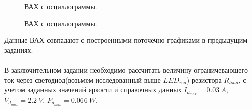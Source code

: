 \documentclass[12pt]{article}
\begin{document}
\begin{figure}[H]
    \centering
        \qquad
        \caption{ВАХ с осциллограммы.}%
    \label{fig:example}
\end{figure}

\begin{figure}[H]
    \centering
        \qquad
        \caption{ВАХ с осциллограммы.}%
    \label{fig:example}
\end{figure}

Данные ВАХ совпадают с построенными поточечно графиками в предыдущим заданиях. \\
\ \\
В заключительном задании необходимо рассчитать величину ограничевающего ток через светодиод(возьмем исследованный выше $LED_{red}$) резистора $R_{load}$, с учетом заданных значений яркости и справочных данных $I_{d_{max}} = 0.03 \ A$, $V_{d_{max}} = 2.2 \ V$, $P_{d_{max}} = 0.066 \ W$. \\
\end{document}
